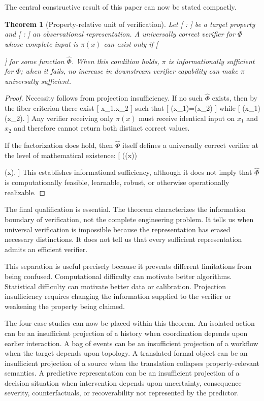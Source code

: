 \documentclass[11pt]{article}
\newtheorem{theorem}{Theorem} \newtheorem{proposition}{Proposition} \newtheorem{lemma}{Lemma} \newtheorem{corollary}{Corollary} \newtheorem{definition}{Definition} \newtheorem{remark}{Remark}
\begin{document}
The central constructive result of this paper can now be stated compactly.

\begin{theorem}[Property-relative unit of verification]
Let
[
\Phi:\rightarrow{}
]
be a target property and
[
\pi:\rightarrow{}
]
an observational representation. A universally correct verifier for $\Phi$ whose complete input is $\pi(x)$ can exist only if
[
\Phi

\widehat{\Phi}\circ\pi
]
for some function $\widehat{\Phi}$. When this condition holds, $\pi$ is informationally sufficient for $\Phi$; when it fails, no increase in downstream verifier capability can make $\pi$ universally sufficient.
\end{theorem}

\begin{proof}
Necessity follows from projection insufficiency. If no such $\widehat{\Phi}$ exists, then by the fiber criterion there exist
[
x_1,x_2
]
such that
[
\pi(x_1)=\pi(x_2)
]
while
[
\Phi(x_1)\neq\Phi(x_2).
]
Any verifier receiving only $\pi(x)$ must receive identical input on $x_1$ and $x_2$ and therefore cannot return both distinct correct values.

If the factorization does hold, then $\widehat{\Phi}$ itself defines a universally correct verifier at the level of mathematical existence:
[
\widehat{\Phi}(\pi(x))

\Phi(x).
]
This establishes informational sufficiency, although it does not imply that $\widehat{\Phi}$ is computationally feasible, learnable, robust, or otherwise operationally realizable.
\end{proof}

The final qualification is essential. The theorem characterizes the information boundary of verification, not the complete engineering problem. It tells us when universal verification is impossible because the representation has erased necessary distinctions. It does not tell us that every sufficient representation admits an efficient verifier.

This separation is useful precisely because it prevents different limitations from being confused. Computational difficulty can motivate better algorithms. Statistical difficulty can motivate better data or calibration. Projection insufficiency requires changing the information supplied to the verifier or weakening the property being claimed.

The four case studies can now be placed within this theorem. An isolated action can be an insufficient projection of a history when coordination depends upon earlier interaction. A bag of events can be an insufficient projection of a workflow when the target depends upon topology. A translated formal object can be an insufficient projection of a source when the translation collapses property-relevant semantics. A predictive representation can be an insufficient projection of a decision situation when intervention depends upon uncertainty, consequence severity, counterfactuals, or recoverability not represented by the predictor.
\end{document}
